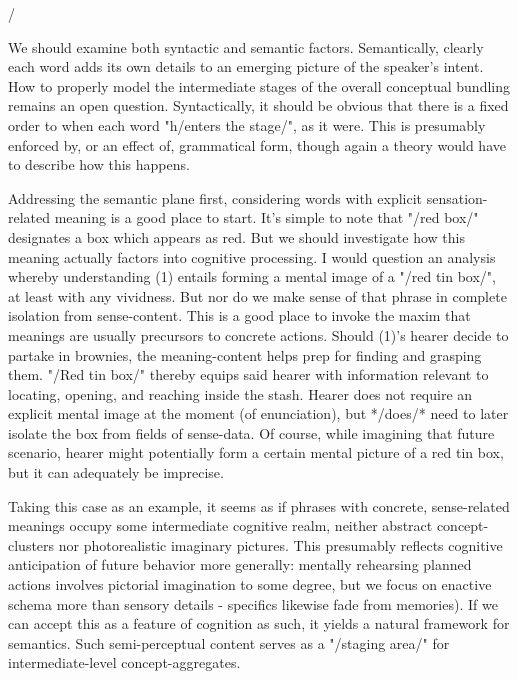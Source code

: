 /


We should examine both syntactic and semantic factors.  
Semantically, clearly each word adds its own 
details to an emerging picture of the speaker's intent.  
How to properly model the intermediate stages 
of the overall conceptual bundling remains an open 
question.  Syntactically, it should be obvious that 
there is a fixed order to when each word "h/enters the stage/", 
as it were.  This is presumably enforced by, or an effect of, 
grammatical form, though again a theory would have to 
describe how this happens.

Addressing the semantic plane first, considering words with 
explicit sensation-related meaning is a good place to start.  
It's simple to note that "/red box/" designates a box which 
appears as red.  But we should investigate how this 
meaning actually factors into cognitive processing.  I would 
question an analysis whereby understanding (1) entails forming a 
mental image of a "/red tin box/", at least with any 
vividness.  But nor do we make sense of that phrase in 
complete isolation from sense-content.  This is a good 
place to invoke the maxim that meanings are usually precursors 
to concrete actions.  Should (1)'s hearer decide to partake in 
brownies, the meaning-content helps prep for finding and grasping them.  
"/Red tin box/" thereby equips said hearer with 
information relevant to locating, opening, and reaching inside the stash.  
Hearer does not require an explicit mental image at the moment 
(of enunciation), but */does/* need to later isolate the box from 
fields of sense-data.  Of course, while imagining that future scenario, 
hearer might potentially form a certain mental picture of a red tin box, 
but it can adequately be imprecise.

Taking this case as an example, it seems as if phrases 
with concrete, sense-related meanings occupy some intermediate 
cognitive realm, neither abstract concept-clusters nor 
photorealistic imaginary pictures.  This presumably reflects 
cognitive anticipation of future behavior more generally: mentally 
rehearsing planned actions involves pictorial imagination to 
some degree, but we focus on enactive schema more than sensory 
details -%
specifics likewise fade from memories).    
If we can accept this as a feature of cognition as such, it yields a 
natural framework for semantics.  Such semi-perceptual content 
serves as a "/staging area/" for intermediate-level concept-aggregates.

